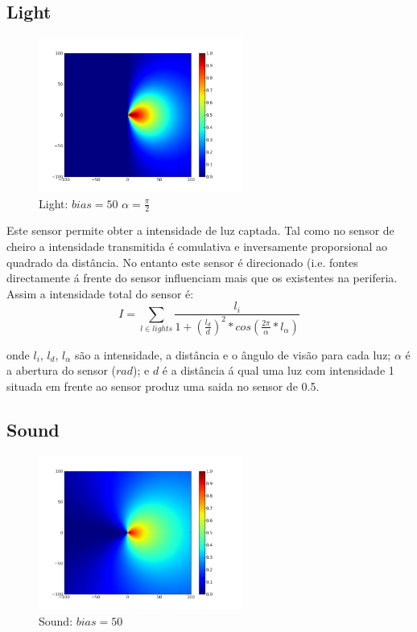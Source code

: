 \documentclass[a4paper]{article}
\begin{document}
\subsection{Light}
\begin{figure}[h]
	\vspace{-20pt}
	\begin{center}
		\includegraphics[width=0.6\textwidth]{graphs/sensors/light.png}
	\end{center}
	\vspace{-20pt}
	\caption{Light: $bias=50$ $\alpha=\frac{\pi}{2}$}
\end{figure}

\indent Este sensor permite obter a intensidade de luz captada. Tal como no sensor de cheiro a intensidade transmitida
é comulativa e inversamente proporsional ao quadrado da distância. No entanto este sensor é direcionado (i.e. fontes
directamente á frente do sensor influenciam mais que os existentes na periferia. Assim a intensidade total do sensor é:
\[
	I = \displaystyle\sum\limits_{l \in lights} \frac{l_{i}}{1 + (\frac{l_{d}}{d})^{2}*cos(\frac{2\pi}{\alpha}*l_{\alpha})}
\]

onde $l_{i}$, $l_{d}$, $l_{\alpha}$ são a intensidade, a distância e o ângulo de visão para cada luz;
$\alpha$ é a abertura do sensor ($rad$);
e $d$ é a distância á qual uma luz com intensidade 1 situada em frente ao sensor produz uma saida no sensor de 0.5.

\cleardoublepage
\subsection{Sound}
\begin{figure}[h]
	\vspace{-20pt}
	\begin{center}
		\includegraphics[width=0.6\textwidth]{graphs/sensors/cardioid.png}
	\end{center}
	\vspace{-20pt}
	\caption{Sound: $bias=50$}
\end{figure}
\end{document}
